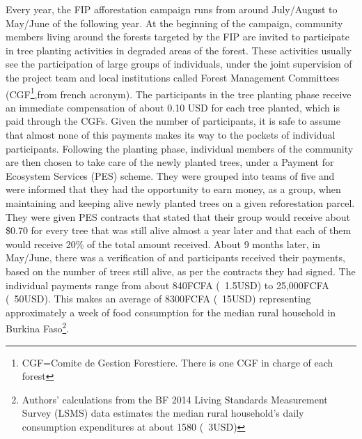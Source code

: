 \documentclass[preprint,12pt]{elsarticle}
\begin{document}
Every year, the FIP afforestation campaign runs from around July/August to May/June of the following year. At the beginning of the campaign, community members living around the forests targeted by the FIP are invited to participate in tree planting activities in degraded areas of the forest. These activities usually see the participation of large groups of individuals, under the joint supervision of the project team and local institutions called Forest Management Committees (CGF\footnote{CGF=Comite de Gestion Forestiere. There is one CGF in charge of each forest},from french acronym). The participants in the tree planting phase receive an immediate compensation of about 0.10 USD for each tree planted, which is paid through the CGFs. Given the number of participants, it is safe to assume that almost none of this payments makes its way to the pockets of individual participants. Following the planting phase, individual members of the community are then chosen to take care of the newly planted trees, under a Payment for Ecosystem Services (PES) scheme. They were grouped into teams of five and were informed that they had the opportunity to earn money, as a group, when maintaining and keeping alive newly planted trees on a given reforestation parcel. They were given PES contracts that stated that their group would receive about \$0.70 for every tree that was still alive almost a year later and that each of them would receive 20\% of the total amount received. About 9 months later, in May/June, there was a verification of and participants received their payments, based on the number of trees still alive, as per the contracts they had signed. The individual payments range from about 840FCFA (~1.5USD) to 25,000FCFA (~50USD). This makes an average of 8300FCFA (~15USD) representing approximately a week of food consumption for the median rural household in Burkina Faso\footnote{Authors' calculations from the BF 2014 Living Standards Measurement Survey (LSMS) data estimates the median rural household's daily consumption expenditures at about 1580 (~3USD) }.    \\
\end{document}
